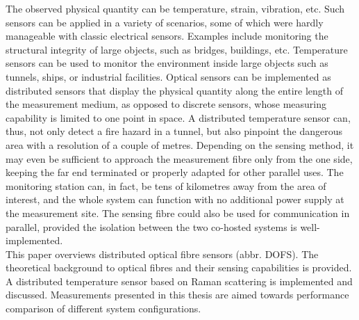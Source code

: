 \documentclass{standalone}
\begin{document}
The observed physical quantity can be temperature, strain, vibration, etc. Such sensors can be applied in a variety of scenarios, some of which were hardly manageable with classic electrical sensors. Examples include monitoring the structural integrity of large objects, such as bridges, buildings, etc. Temperature sensors can be used to monitor the environment inside large objects such as tunnels, ships, or industrial facilities. Optical sensors can be implemented as distributed sensors that display the physical quantity along the entire length of the measurement medium, as opposed to discrete sensors, whose measuring capability is limited to one point in space. A distributed temperature sensor can, thus, not only detect a fire hazard in a tunnel, but also pinpoint the dangerous area with a resolution of a couple of metres. Depending on the sensing method, it may even be sufficient to approach the measurement fibre only from the one side, keeping the far end terminated or properly adapted for other parallel uses. The monitoring station can, in fact, be tens of kilometres away from the area of interest, and the whole system can function with no additional power supply at the measurement site. The sensing fibre could also be used for communication in parallel, provided the isolation between the two co-hosted systems is well-implemented. \\

This paper overviews distributed optical fibre sensors (abbr. DOFS). The theoretical background to optical fibres and their sensing capabilities is provided. A distributed temperature sensor based on Raman scattering is implemented and discussed. Measurements presented in this thesis are aimed towards performance comparison of different system configurations.



\setcounter{stranica}{\thepage}
\addtocounter{stranica}{1}
\end{document}
